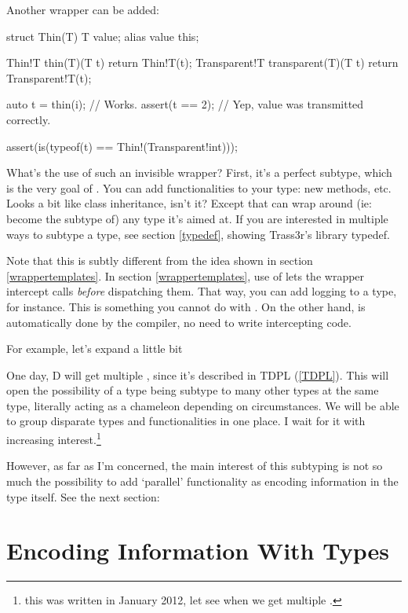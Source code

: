 Another wrapper can be added:

\begin{dcode}
struct Thin(T)
{
    T value;
    alias value this;
}

Thin!T thin(T)(T t)
{
    return Thin!T(t);
}Transparent!T transparent(T)(T t)
{
    return Transparent!T(t);
}

auto t = thin(i); // Works.
assert(t == 2); // Yep, value was transmitted correctly.

assert(is(typeof(t) == Thin!(Transparent!int)));
\end{dcode}

What's the use of such an invisible wrapper? First, it's a perfect subtype, which is the very goal of . You can add functionalities to your type: new methods, etc. Looks a bit like class inheritance, isn't it? Except that  can wrap around (ie: become the subtype of) any type it's aimed at. If you are interested in multiple ways to subtype a type, see section \ref{typedef}, showing Trass3r's library typedef.

Note that this is subtly different from the idea shown in section \ref{wrappertemplates}. In section \ref{wrappertemplates}, use of  lets the wrapper intercept calls \emph{before} dispatching them. That way, you can add logging to a type, for instance. This is something you cannot do with . On the other hand,  is automatically done by the compiler, no need to write intercepting code.

For example, let's expand  a little bit 

One day, D will get multiple , since it's described in TDPL (\ref{TDPL}). This will open the possibility of a type being subtype to many other types at the same type, literally acting as a chameleon depending on circumstances. We will be able to group disparate types and functionalities in one place. I wait for it with increasing interest.\footnote{this was written in January 2012, let see when we get multiple .}

However, as far as I'm concerned, the main interest of this subtyping is not so much the possibility to add `parallel' functionality as encoding information in the type itself. See the next section:

\section{Encoding Information With Types} \label{encodinginformationwithtypes}


